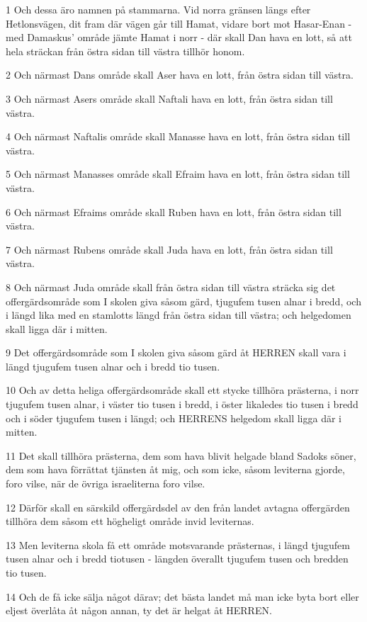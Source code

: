 \par 1 Och dessa äro namnen på stammarna. Vid norra gränsen längs efter Hetlonsvägen, dit fram där vägen går till Hamat, vidare bort mot Hasar-Enan - med Damaskus' område jämte Hamat i norr - där skall Dan hava en lott, så att hela sträckan från östra sidan till västra tillhör honom.
\par 2 Och närmast Dans område skall Aser hava en lott, från östra sidan till västra.
\par 3 Och närmast Asers område skall Naftali hava en lott, från östra sidan till västra.
\par 4 Och närmast Naftalis område skall Manasse hava en lott, från östra sidan till västra.
\par 5 Och närmast Manasses område skall Efraim hava en lott, från östra sidan till västra.
\par 6 Och närmast Efraims område skall Ruben hava en lott, från östra sidan till västra.
\par 7 Och närmast Rubens område skall Juda hava en lott, från östra sidan till västra.
\par 8 Och närmast Juda område skall från östra sidan till västra sträcka sig det offergärdsområde som I skolen giva såsom gärd, tjugufem tusen alnar i bredd, och i längd lika med en stamlotts längd från östra sidan till västra; och helgedomen skall ligga där i mitten.
\par 9 Det offergärdsområde som I skolen giva såsom gärd åt HERREN skall vara i längd tjugufem tusen alnar och i bredd tio tusen.
\par 10 Och av detta heliga offergärdsområde skall ett stycke tillhöra prästerna, i norr tjugufem tusen alnar, i väster tio tusen i bredd, i öster likaledes tio tusen i bredd och i söder tjugufem tusen i längd; och HERRENS helgedom skall ligga där i mitten.
\par 11 Det skall tillhöra prästerna, dem som hava blivit helgade bland Sadoks söner, dem som hava förrättat tjänsten åt mig, och som icke, såsom leviterna gjorde, foro vilse, när de övriga israeliterna foro vilse.
\par 12 Därför skall en särskild offergärdsdel av den från landet avtagna offergärden tillhöra dem såsom ett högheligt område invid leviternas.
\par 13 Men leviterna skola få ett område motsvarande prästernas, i längd tjugufem tusen alnar och i bredd tiotusen - längden överallt tjugufem tusen och bredden tio tusen.
\par 14 Och de få icke sälja något därav; det bästa landet må man icke byta bort eller eljest överlåta åt någon annan, ty det är helgat åt HERREN.
